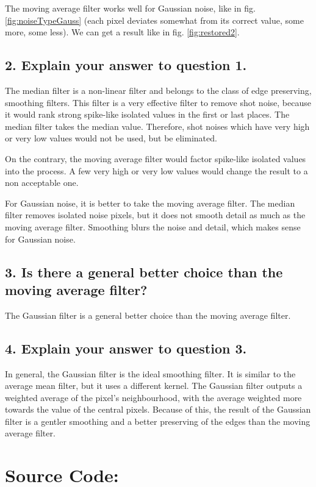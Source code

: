 \documentclass[a4paper,headings=small]{scrartcl}
\numberwithin{equation}{section} %
\numberwithin{figure}{section}   %
\begin{document}
The moving average filter works well for Gaussian noise,
like in fig. \ref{fig:noiseTypeGauss}
(each pixel deviates somewhat from its correct value, some more, some less).
We can get a result like in fig. \ref{fig:restored2}.


\subsection{2. Explain your answer to question 1.}

The median filter is a non-linear filter and belongs to the class of edge preserving, smoothing filters.
This filter is a very effective filter to remove shot noise,
because it would rank strong spike-like isolated values in the first or last places.
The median filter takes the median value.
Therefore, shot noises which have very high or very low values would not be used, but be eliminated.

On the contrary, the moving average filter would factor spike-like isolated values into the process.
A few very high or very low values would change the result to a non acceptable one.

For Gaussian noise, it is better to take the moving average filter.
The median filter removes isolated noise pixels, but it does not smooth detail as much as the moving average filter.
Smoothing blurs the noise and detail, which makes sense for Gaussian noise.

\subsection{3. Is there a general better choice than the moving average filter?}

The Gaussian filter is a general better choice than the moving average filter.

\subsection{4. Explain your answer to question 3.}

In general, the Gaussian filter is the ideal smoothing filter.
It is similar to the average mean filter,
but it uses a different kernel.
The Gaussian filter outputs a weighted average of the pixel's neighbourhood,
with the average weighted more towards the value of the central pixels.
Because of this, the result of the Gaussian filter is a gentler smoothing
and a better preserving of the edges than the moving average filter.


\newpage
\section{Source Code:}


\end{document}
